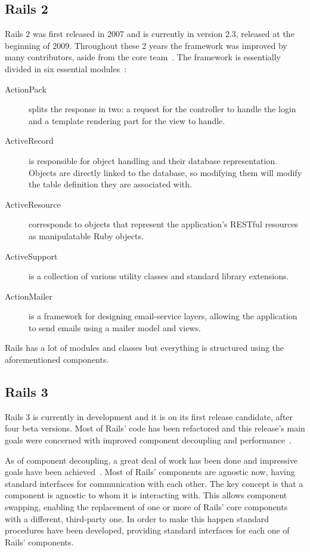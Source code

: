 \subsection{Rails 2}
\label{tech:sec:ruby_on_rails:rails2}
Rails 2 was first released in 2007 and is currently in version 2.3, released at the beginning of 2009. Throughout these 2 years the framework was improved by many contributors, aside from the core team~\cite{rails_core_team}. The framework is essentially divided in six essential modules~\cite{ruby_on_rails_principles, rails23_release_notes}:
\begin{description}
\item[ActionPack] splits the response in two:  a request for the controller to handle the login and a template rendering part for the view to handle.
\item[ActiveRecord] is responsible for object handling and their database representation. Objects are directly linked to the database, so modifying them will modify the table definition they are associated with.
\item[ActiveResource] corresponds to objects that represent the application's RESTful resources as manipulatable Ruby objects.
\item[ActiveSupport] is a collection of various utility classes and standard library extensions.
\item[ActionMailer] is a framework for designing email-service layers, allowing the application to send emails using a mailer model and views.
\end{description}
Rails has a lot of modules and classes but everything is structured using the aforementioned components.


\subsection{Rails 3}
\label{tech:sec:ruby_on_rails:rails3}
Rails 3 is currently in development and it is on its first release candidate, after four beta versions. Most of Rails' code has been refactored and this release's main goals were concerned with improved component decoupling and performance~\cite{rails3_great_decoupling}. 

As of component decoupling, a great deal of work has been done and impressive goals have been achieved~\cite{vaporware_to_awesome}. Most of Rails' components are agnostic now, having standard interfaces for communication with each other. The key concept is that a component is agnostic to whom it is interacting with. This allows component swapping, enabling the replacement of one or more of Rails' core components with a different, third-party one. In order to make this happen standard procedures have been developed, providing standard interfaces for each one of Rails' components.

